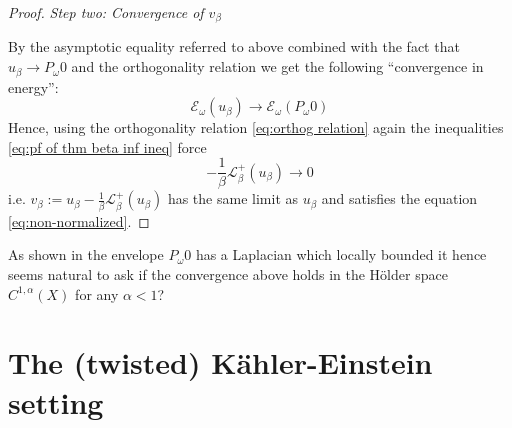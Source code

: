 \documentclass[11pt,oneside,english]{amsart}
\numberwithin{equation}{section}
\numberwithin{figure}{section}
\theoremstyle{plain}
\theoremstyle{plain}
\theoremstyle{plain}
\theoremstyle{plain}
\theoremstyle{remark}
\theoremstyle{definition}
\begin{document}
\begin{proof}
\emph{Step two: Convergence of $v_{\beta}$}

By the asymptotic equality referred to above combined with the fact
that $u_{\beta}\rightarrow P_{\omega}0$ and the orthogonality relation
we get the following ``convergence in energy'': 
\[
\mathcal{E_{\omega}}(u_{\beta})\rightarrow\mathcal{E_{\omega}}(P_{\omega}0)
\]
 Hence, using the orthogonality relation \ref{eq:orthog relation}
again the inequalities \ref{eq:pf of thm beta inf ineq} force 
\[
-\frac{1}{\beta}\mathcal{L}_{\beta}^{+}(u_{\beta})\rightarrow0
\]
 i.e. $v_{\beta}:=u_{\beta}-\frac{1}{\beta}\mathcal{L}_{\beta}^{+}(u_{\beta})$
has the same limit as $u_{\beta}$ and satisfies the equation \ref{eq:non-normalized}. 
\end{proof}
As shown in \cite{b-d} the envelope $P_{\omega}0$ has a Laplacian
which locally bounded it hence seems natural to ask if the convergence
above holds in the Hölder space $C^{1,\alpha}(X)$ for any $\alpha<1$?

\section{\label{sub:The-(twisted)-K=00003D0000E4hler-Einstein}The (twisted)
Kähler-Einstein setting}
\end{document}

